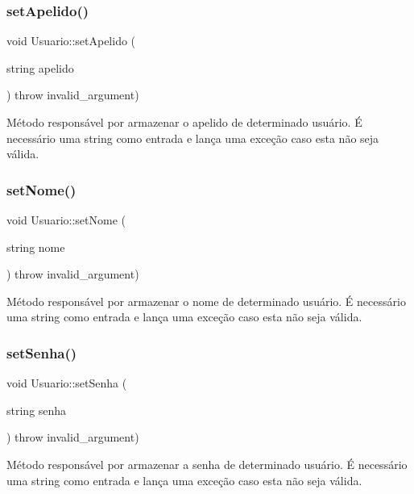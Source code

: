 \subsubsection{\texorpdfstring{set\+Apelido()}{setApelido()}}
{\footnotesize\ttfamily void Usuario\+::set\+Apelido (\begin{DoxyParamCaption}\item[{string}]{apelido }\end{DoxyParamCaption}) throw  invalid\+\_\+argument) }

Método responsável por armazenar o apelido de determinado usuário. É necessário uma string como entrada e lança uma exceção caso esta não seja válida. \mbox{\label{classUsuario_a0d002d4ceff9c827457269a24a3e6c24}} 
\subsubsection{\texorpdfstring{set\+Nome()}{setNome()}}
{\footnotesize\ttfamily void Usuario\+::set\+Nome (\begin{DoxyParamCaption}\item[{string}]{nome }\end{DoxyParamCaption}) throw  invalid\+\_\+argument) }

Método responsável por armazenar o nome de determinado usuário. É necessário uma string como entrada e lança uma exceção caso esta não seja válida. \mbox{\label{classUsuario_a428675e3b6d3743e05b1297cca1dee42}} 
\subsubsection{\texorpdfstring{set\+Senha()}{setSenha()}}
{\footnotesize\ttfamily void Usuario\+::set\+Senha (\begin{DoxyParamCaption}\item[{string}]{senha }\end{DoxyParamCaption}) throw  invalid\+\_\+argument) }

Método responsável por armazenar a senha de determinado usuário. É necessário uma string como entrada e lança uma exceção caso esta não seja válida. \mbox{\label{classUsuario_adae349ec93a5a83bb4e2b379a181431b}} 
